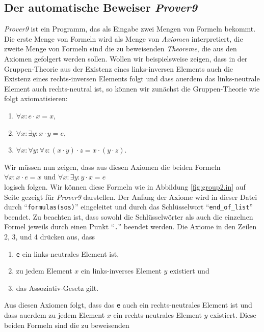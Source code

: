 \subsection{Der automatische Beweiser \textsl{Prover9}}
\textsl{Prover9} ist ein Programm, das als Eingabe zwei Mengen von Formeln bekommt.  Die erste Menge von
Formeln wird als Menge von \emph{Axiomen} interpretiert, die zweite Menge von Formeln sind die zu
beweisenden \emph{Theoreme}, die aus den Axiomen gefolgert werden sollen.  Wollen wir beispielsweise zeigen,
dass in der Gruppen-Theorie aus der Existenz eines  links-inversen Elements auch die Existenz eines
rechts-inversen Elements folgt und dass au\3erdem das links-neutrale Element auch rechts-neutral ist,
so k\"{o}nnen wir zun\"{a}chst die Gruppen-Theorie wie folgt axiomatisieren:
\begin{enumerate}
\item $\forall x: e \cdot x = x$,
\item $\forall x: \exists y: x \cdot y = e$,
\item $\forall x: \forall y: \forall z: (x \cdot y) \cdot z = x \cdot (y \cdot z)$.
\end{enumerate}
Wir m\"{u}ssen nun zeigen, dass aus diesen Axiomen die beiden Formeln
\\[0.2cm]
\hspace*{1.3cm}
$\forall x: x \cdot e = x$ \quad und \quad $\forall x: \exists y: y \cdot x = e$ 
\\[0.2cm]
logisch folgen.  Wir k\"{o}nnen diese Formeln wie in Abbildung \ref{fig:group2.in} auf Seite
\pageref{fig:group2.in} gezeigt f\"{u}r \textsl{Prover9} darstellen.
Der Anfang der Axiome wird in dieser Datei durch ``\texttt{formulas(sos)}'' eingeleitet und durch
das Schl\"{u}sselwort ``\texttt{end\_of\_list}'' beendet.  Zu beachten ist, dass sowohl die Schl\"{u}sselw\"{o}rter als
auch die einzelnen Formel jeweils durch einen Punkt ``\texttt{.}'' beendet werden.  Die Axiome in den Zeilen
2, 3, und 4 dr\"{u}cken aus, dass 
\begin{enumerate}
\item \texttt{e} ein links-neutrales Element ist,
\item zu jedem Element $x$ ein links-inverses Element $y$ existiert und
\item das Assoziativ-Gesetz gilt.
\end{enumerate}
Aus diesen Axiomen folgt, dass das \texttt{e} auch ein rechts-neutrales Element ist und dass au\3erdem zu
jedem Element $x$ ein rechts-neutrales Element $y$ existiert.  Diese beiden  Formeln sind die zu beweisenden 
